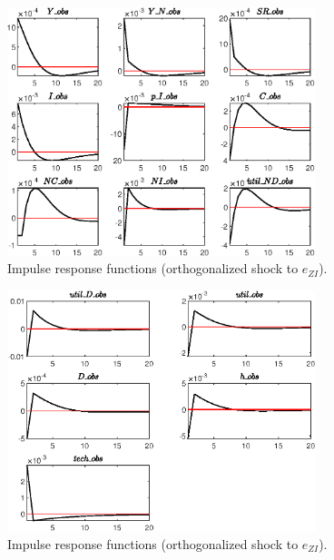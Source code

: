 \begin{figure}[H]
\centering 
\includegraphics[width=0.80\textwidth]{BRS_sectoral/graphs/BRS_sectoral_IRF_e_ZI1}
\caption{Impulse response functions (orthogonalized shock to ${e_{ZI}}$).}\label{Fig:IRF:e_ZI:1}
\end{figure}
 
\begin{figure}[H]
\centering 
\includegraphics[width=0.80\textwidth]{BRS_sectoral/graphs/BRS_sectoral_IRF_e_ZI2}
\caption{Impulse response functions (orthogonalized shock to ${e_{ZI}}$).}\label{Fig:IRF:e_ZI:2}
\end{figure}
 
